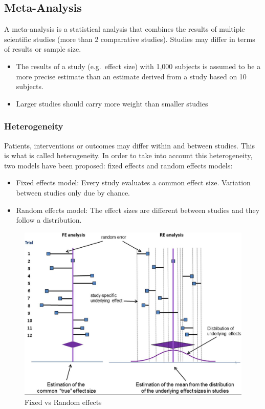 \documentclass[
]{book}
\providecommand{\tightlist}{%
  \setlength{\itemsep}{0pt}\setlength{\parskip}{0pt}}
\begin{document}
\hypertarget{meta-analysis}{%
\subsection{Meta-Analysis}\label{meta-analysis}}

A meta-analysis is a statistical analysis that combines the results of multiple scientific studies (more than 2 comparative studies). Studies may differ in terms of results or sample size.

\begin{itemize}
\item
  The results of a study (e.g.~effect size) with 1,000 subjects is assumed to be a more precise estimate than an estimate derived from a study
  based on 10 subjects.
\item
  Larger studies should carry more weight than smaller studies
\end{itemize}

\hypertarget{heterogeneity}{%
\subsubsection{Heterogeneity}\label{heterogeneity}}

Patients, interventions or outcomes may differ within and between studies. This is what is called heterogeneity. In order to take into account this heterogeneity, two models have been proposed: fixed effects and random effects models:

\begin{itemize}
\tightlist
\item
  Fixed effects model: Every study evaluates a common effect size. Variation between studies only due by chance.
\item
  Random effects model: The effect sizes are different between studies and they follow a distribution.
\end{itemize}

\begin{figure}

{\centering \includegraphics[width=17.71in]{images/fixed} 

}

\caption{Fixed vs Random effects}\label{fig:unnamed-chunk-4}
\end{figure}
\end{document}
